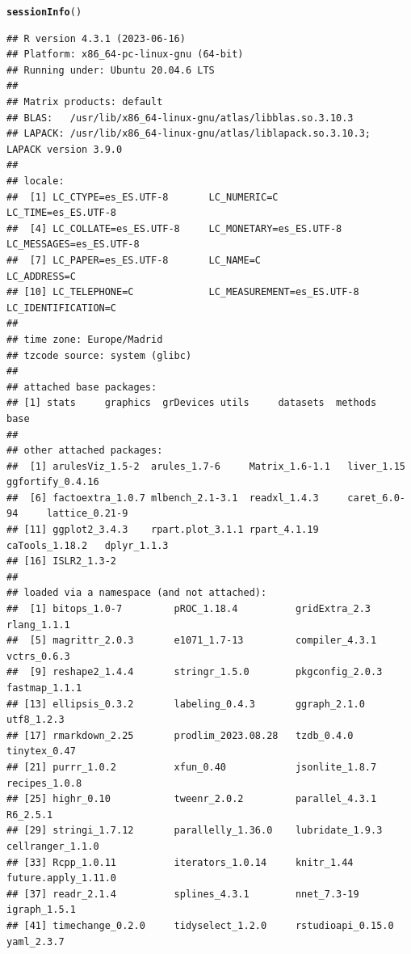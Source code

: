 \documentclass{article}\usepackage[]{graphicx}\usepackage[]{xcolor}
\makeatletter
\newcommand{\hlstd}[1]{\textcolor[rgb]{0.345,0.345,0.345}{#1}}%
\newcommand{\hlkwd}[1]{\textcolor[rgb]{0.737,0.353,0.396}{\textbf{#1}}}%
\newenvironment{kframe}{%
 \def\at@end@of@kframe{}%
 \ifinner\ifhmode%
  \def\at@end@of@kframe{\end{minipage}}%
  \begin{minipage}{\columnwidth}%
 \fi\fi%
 \def\FrameCommand##1{\hskip\@totalleftmargin \hskip-\fboxsep
 \colorbox{shadecolor}{##1}\hskip-\fboxsep
     \hskip-\linewidth \hskip-\@totalleftmargin \hskip\columnwidth}%
 \MakeFramed {\advance\hsize-\width
   \@totalleftmargin\z@ \linewidth\hsize
   \@setminipage}}%
 {\par\unskip\endMakeFramed%
 \at@end@of@kframe}
\newenvironment{knitrout}{}{} %
\makeatother
\begin{document}
\begin{knitrout}
\color{fgcolor}\begin{kframe}
\begin{alltt}
\hlkwd{sessionInfo}\hlstd{()}
\end{alltt}
\begin{verbatim}
## R version 4.3.1 (2023-06-16)
## Platform: x86_64-pc-linux-gnu (64-bit)
## Running under: Ubuntu 20.04.6 LTS
## 
## Matrix products: default
## BLAS:   /usr/lib/x86_64-linux-gnu/atlas/libblas.so.3.10.3 
## LAPACK: /usr/lib/x86_64-linux-gnu/atlas/liblapack.so.3.10.3;  LAPACK version 3.9.0
## 
## locale:
##  [1] LC_CTYPE=es_ES.UTF-8       LC_NUMERIC=C               LC_TIME=es_ES.UTF-8       
##  [4] LC_COLLATE=es_ES.UTF-8     LC_MONETARY=es_ES.UTF-8    LC_MESSAGES=es_ES.UTF-8   
##  [7] LC_PAPER=es_ES.UTF-8       LC_NAME=C                  LC_ADDRESS=C              
## [10] LC_TELEPHONE=C             LC_MEASUREMENT=es_ES.UTF-8 LC_IDENTIFICATION=C       
## 
## time zone: Europe/Madrid
## tzcode source: system (glibc)
## 
## attached base packages:
## [1] stats     graphics  grDevices utils     datasets  methods   base     
## 
## other attached packages:
##  [1] arulesViz_1.5-2  arules_1.7-6     Matrix_1.6-1.1   liver_1.15       ggfortify_0.4.16
##  [6] factoextra_1.0.7 mlbench_2.1-3.1  readxl_1.4.3     caret_6.0-94     lattice_0.21-9  
## [11] ggplot2_3.4.3    rpart.plot_3.1.1 rpart_4.1.19     caTools_1.18.2   dplyr_1.1.3     
## [16] ISLR2_1.3-2     
## 
## loaded via a namespace (and not attached):
##  [1] bitops_1.0-7         pROC_1.18.4          gridExtra_2.3        rlang_1.1.1         
##  [5] magrittr_2.0.3       e1071_1.7-13         compiler_4.3.1       vctrs_0.6.3         
##  [9] reshape2_1.4.4       stringr_1.5.0        pkgconfig_2.0.3      fastmap_1.1.1       
## [13] ellipsis_0.3.2       labeling_0.4.3       ggraph_2.1.0         utf8_1.2.3          
## [17] rmarkdown_2.25       prodlim_2023.08.28   tzdb_0.4.0           tinytex_0.47        
## [21] purrr_1.0.2          xfun_0.40            jsonlite_1.8.7       recipes_1.0.8       
## [25] highr_0.10           tweenr_2.0.2         parallel_4.3.1       R6_2.5.1            
## [29] stringi_1.7.12       parallelly_1.36.0    lubridate_1.9.3      cellranger_1.1.0    
## [33] Rcpp_1.0.11          iterators_1.0.14     knitr_1.44           future.apply_1.11.0 
## [37] readr_2.1.4          splines_4.3.1        nnet_7.3-19          igraph_1.5.1        
## [41] timechange_0.2.0     tidyselect_1.2.0     rstudioapi_0.15.0    yaml_2.3.7          

\end{verbatim}
\end{kframe}
\end{knitrout}
\end{document}
